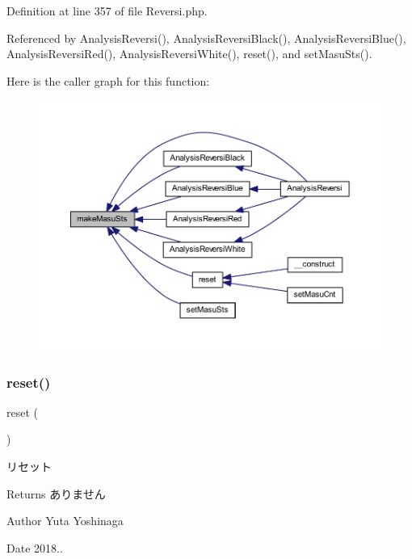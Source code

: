 Definition at line 357 of file Reversi.\+php.



Referenced by Analysis\+Reversi(), Analysis\+Reversi\+Black(), Analysis\+Reversi\+Blue(), Analysis\+Reversi\+Red(), Analysis\+Reversi\+White(), reset(), and set\+Masu\+Sts().

Here is the caller graph for this function\+:\nopagebreak
\begin{figure}[H]
\begin{center}
\leavevmode
\includegraphics[width=350pt]{class_reversi_a88869682786bb7c45c3488113deaa789_icgraph}
\end{center}
\end{figure}
\mbox{\label{class_reversi_a4a20559544fdf4dcb457e258dc976cf8}} 
\subsubsection{\texorpdfstring{reset()}{reset()}}
{\footnotesize\ttfamily reset (\begin{DoxyParamCaption}{ }\end{DoxyParamCaption})}



リセット 

\begin{DoxyReturn}{Returns}
ありません 
\end{DoxyReturn}
\begin{DoxyAuthor}{Author}
Yuta Yoshinaga 
\end{DoxyAuthor}
\begin{DoxyDate}{Date}
2018.. 
\end{DoxyDate}


